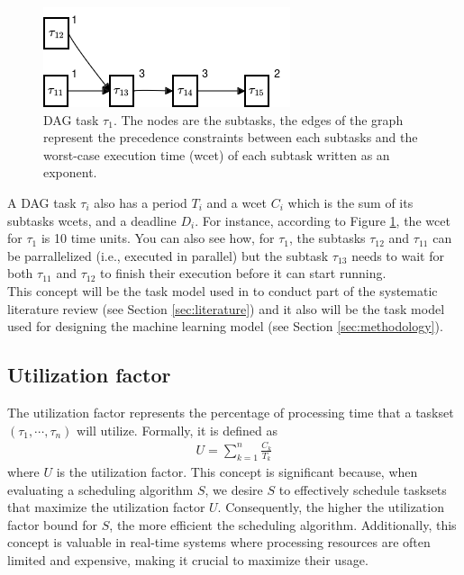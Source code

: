 \begin{figure}
    \centering
    \includegraphics[width=0.5\linewidth]{images/example_dag.png}
    \caption{DAG task $\tau_1$. The nodes are the subtasks,
    the edges of the graph represent the precedence constraints between each subtasks and the worst-case execution time (wcet) of each subtask written as an exponent.}
    \label{fig:dag_example}
\end{figure}

A DAG task $\tau_i$ also has a period $T_i$ and a wcet $C_i$ which 
is the sum of its subtasks wcets, and a deadline $D_i$.
For instance, according to Figure \ref{fig:dag_example},
the wcet for $\tau_1$ is 10 time units.
You can also see how, for $\tau_1$, 
the subtasks $\tau_{12}$ and $\tau_{11}$ can be parrallelized (i.e., 
executed in parallel) but the subtask $\tau_{13}$ needs to wait 
for both $\tau_{11}$ and $\tau_{12}$ to finish their execution 
before it can start running.
\\

This concept will be the task model used in to conduct 
part of the systematic literature review (see Section \ref{sec:literature})
and it also will be the task model used for designing 
the machine learning model (see Section \ref{sec:methodology}).


\subsection{Utilization factor}

The utilization factor represents the percentage of processing 
time that a taskset $(\tau_1, \cdots, \tau_n)$ will utilize. 
Formally, it is defined as
\begin{align}
U = \sum_{k=1}^{n} \frac{C_k}{T_k}
\end{align}
where $U$ is the utilization factor. This concept is significant 
because, when evaluating a scheduling algorithm $S$, we desire 
$S$ to effectively schedule tasksets that maximize the utilization 
factor $U$. Consequently, the higher the utilization factor bound 
for $S$, the more efficient the scheduling algorithm. Additionally, 
this concept is valuable in real-time systems where processing 
resources are often limited and expensive, making it crucial to 
maximize their usage.

